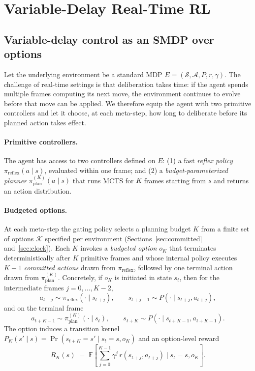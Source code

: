 \documentclass{article}
\newcommand{\Kset}{\mathcal{K}}
\begin{document}
\section{Variable-Delay Real-Time RL}
\label{sec:envs}

\subsection{Variable-delay control as an SMDP over options}
\label{sec:smdp}

Let the underlying environment be a standard MDP
$E = (\mathcal{S}, \mathcal{A}, P, r, \gamma)$.
The challenge of real-time settings is that deliberation takes time:
if the agent spends multiple frames computing its next move, the
environment continues to evolve before that move can be applied.
We therefore equip the agent with two primitive controllers and let
it choose, at each meta-step, how long to deliberate before its
planned action takes effect.

\paragraph{Primitive controllers.}
The agent has access to two controllers defined on $E$: (1) a fast \emph{reflex policy}
    $\pi_{\mathrm{reflex}}(a \mid s)$, evaluated within one frame;
    and (2) a \emph{budget-parameterized planner}
    $\pi_{\mathrm{plan}}^{(K)}(a \mid s)$ that runs MCTS for $K$
    frames starting from $s$ and returns an action distribution.

\paragraph{Budgeted options.}
At each meta-step the gating policy selects a planning budget $K$
from a finite set of options $\Kset$ specified per environment
(Sections~\ref{sec:committed} and~\ref{sec:clock}).
Each $K$ invokes a \emph{budgeted option} $o_K$ that terminates
deterministically after $K$ primitive frames and whose internal
policy executes $K-1$ \emph{committed actions} drawn from
$\pi_{\mathrm{reflex}}$, followed by one terminal action drawn from
$\pi_{\mathrm{plan}}^{(K)}$.
Concretely, if $o_K$ is initiated in state $s_t$, then for the
intermediate frames $j = 0, \dots, K-2$,
\begin{equation}
  a_{t+j} \sim \pi_{\mathrm{reflex}}(\cdot \mid s_{t+j}),
  \qquad
  s_{t+j+1} \sim P(\cdot \mid s_{t+j}, a_{t+j}),
\end{equation}
and on the terminal frame
\begin{equation}
  a_{t+K-1} \sim \pi_{\mathrm{plan}}^{(K)}(\cdot \mid s_t),
  \qquad
  s_{t+K} \sim P(\cdot \mid s_{t+K-1}, a_{t+K-1}).
\end{equation}
The option induces a transition kernel
$P_K(s' \mid s) = \Pr(s_{t+K} = s' \mid s_t = s, o_K)$ and an
option-level reward
\begin{equation}
  R_K(s) \;=\; \mathbb{E}\!\left[
    \sum_{j=0}^{K-1} \gamma^j \, r(s_{t+j}, a_{t+j})
    \;\Big|\; s_t = s, o_K
  \right].
\end{equation}
\end{document}
